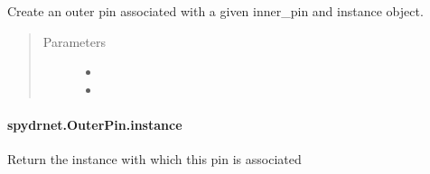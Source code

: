 \documentclass[letterpaper,10pt,english,openany,oneside]{sphinxmanual}
\begin{document}
\begin{fulllineitems}
\label{\detokenize{reference/classes/generated/spydrnet.OuterPin.from_instance_and_inner_pin:spydrnet.OuterPin.from_instance_and_inner_pin}}
Create an outer pin associated with a given inner\_pin and instance object.
\begin{quote}\begin{description}
\item[{Parameters}] \leavevmode\begin{itemize}
\item {} 

\item {} 

\end{itemize}

\end{description}\end{quote}

\end{fulllineitems}



\paragraph{spydrnet.OuterPin.instance}
\label{\detokenize{reference/classes/generated/spydrnet.OuterPin.instance:spydrnet-outerpin-instance}}\label{\detokenize{reference/classes/generated/spydrnet.OuterPin.instance::doc}}

\begin{fulllineitems}
\label{\detokenize{reference/classes/generated/spydrnet.OuterPin.instance:spydrnet.OuterPin.instance}}
Return the instance with which this pin is associated

\end{fulllineitems}
\end{document}
